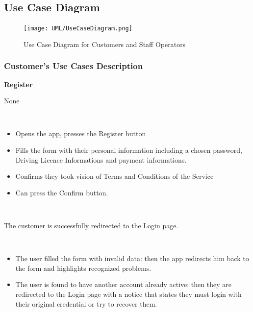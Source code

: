 \documentclass[11pt]{article} %
\begin{document}
\subsection{Use Case Diagram}
\begin{figure}[H]
	\centering
	\texttt{[image: UML/UseCaseDiagram.png]}
	\caption{Use Case Diagram for Customers and Staff Operators}
\end{figure}

\subsubsection{Customer's Use Cases Description}


\begin{description}[noitemsep,topsep=0pt,parsep=0pt,partopsep=0pt]
	\item[Name:] \textbf{Register}
	\item[Entry Conditions:] None
	\item[Flow Of Events:] \hfill\
	\begin{itemize}
		\item Opens the app, presses the Register button
		\item Fills the form with their personal information including a chosen password, Driving Licence Informations and payment informations.
		\item Confirms they took vision of Terms and Conditions of the Service 
		\item Can press the Confirm button.
	\end{itemize} \hfill\
	\item[Exit conditions:] The customer is successfully redirected to the Login page.
	\item[Exceptions:]  \hfill\
	\begin{itemize}
		\item The user filled the form with invalid data: then the app redirects him back to the form and highlights recognized problems. 
		\item The user is found to have another account already active: then they are redirected to the Login 	page with a notice that states they must login with their original credential or try to recover them.
	\end{itemize}
\end{description}
\hfill\
\end{document}
